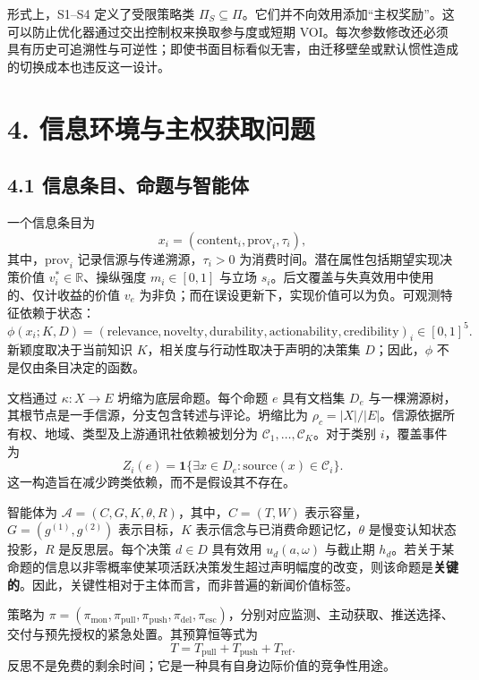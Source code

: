 \documentclass[
  chinese,
  11pt]{article}
\begin{document}
形式上，S1--S4 定义了受限策略类 \(\Pi_S\subseteq\Pi\)。它们并不向效用添加``主权奖励''。这可以防止优化器通过交出控制权来换取参与度或短期 VOI。每次参数修改还必须具有历史可追溯性与可逆性；即使书面目标看似无害，由迁移壁垒或默认惯性造成的切换成本也违反这一设计。

\section{4. 信息环境与主权获取问题}\label{ux4fe1ux606fux73afux5883ux4e0eux4e3bux6743ux83b7ux53d6ux95eeux9898}

\subsection{4.1 信息条目、命题与智能体}\label{ux4fe1ux606fux6761ux76eeux547dux9898ux4e0eux667aux80fdux4f53}

一个信息条目为 \[
x_i=(\mathrm{content}_i,\mathrm{prov}_i,\tau_i),
\] 其中，\(\mathrm{prov}_i\) 记录信源与传递溯源，\(\tau_i>0\) 为消费时间。潜在属性包括期望实现决策价值 \(v_i^*\in\mathbb R\)、操纵强度 \(m_i\in[0,1]\) 与立场 \(s_i\)。后文覆盖与失真效用中使用的、仅计收益的价值 \(v_e\) 为非负；而在误设更新下，实现价值可以为负。可观测特征依赖于状态： \[
\phi(x_i;K,D)=(\mathrm{relevance},\mathrm{novelty},\mathrm{durability},
\mathrm{actionability},\mathrm{credibility})_i\in[0,1]^5.
\] 新颖度取决于当前知识 \(K\)，相关度与行动性取决于声明的决策集 \(D\)；因此，\(\phi\) 不是仅由条目决定的函数。

文档通过 \(\kappa:X\to E\) 坍缩为底层命题。每个命题 \(e\) 具有文档集 \(D_e\) 与一棵溯源树，其根节点是一手信源，分支包含转述与评论。坍缩比为 \(\rho_c=|X|/|E|\)。信源依据所有权、地域、类型及上游通讯社依赖被划分为 \(\mathcal C_1,\ldots,\mathcal C_K\)。对于类别 \(i\)，覆盖事件为 \[
Z_i(e)=\mathbf 1\{\exists x\in D_e:\mathrm{source}(x)\in\mathcal C_i\}.
\] 这一构造旨在减少跨类依赖，而不是假设其不存在。

智能体为 \(\mathcal A=(C,G,K,\theta,R)\)，其中，\(C=(T,W)\) 表示容量，\(G=(g^{(1)},g^{(2)})\) 表示目标，\(K\) 表示信念与已消费命题记忆，\(\theta\) 是慢变认知状态投影，\(R\) 是反思层。每个决策 \(d\in D\) 具有效用 \(u_d(a,\omega)\) 与截止期 \(h_d\)。若关于某命题的信息以非零概率使某项活跃决策发生超过声明幅度的改变，则该命题是\textbf{关键的}。因此，关键性相对于主体而言，而非普遍的新闻价值标签。

策略为 \(\pi=(\pi_{\mathrm{mon}},\pi_{\mathrm{pull}},\pi_{\mathrm{push}},\pi_{\mathrm{del}},\pi_{\mathrm{esc}})\)，分别对应监测、主动获取、推送选择、交付与预先授权的紧急处置。其预算恒等式为 \[
T=T_{\mathrm{pull}}+T_{\mathrm{push}}+T_{\mathrm{ref}}.
\] 反思不是免费的剩余时间；它是一种具有自身边际价值的竞争性用途。
\end{document}

